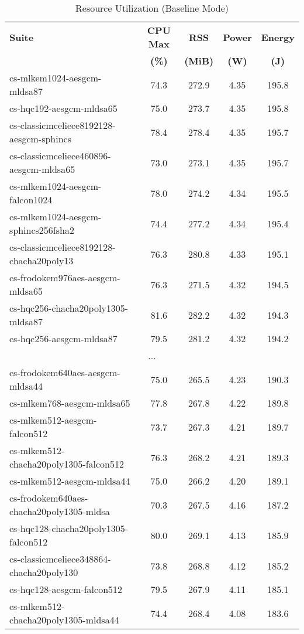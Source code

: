 \begin{table}[htbp]
\centering
\caption{Resource Utilization (Baseline Mode)}
\label{tab:resource_util}
\small
\begin{tabular}{@{}lcccc@{}}
\toprule
\textbf{Suite} & \textbf{CPU Max} & \textbf{RSS} & \textbf{Power} & \textbf{Energy} \\
 & \textbf{(\%)} & \textbf{(MiB)} & \textbf{(W)} & \textbf{(J)} \\
\midrule
cs-mlkem1024-aesgcm-mldsa87 & 74.3 & 272.9 & 4.35 & 195.8 \\
cs-hqc192-aesgcm-mldsa65 & 75.0 & 273.7 & 4.35 & 195.8 \\
cs-classicmceliece8192128-aesgcm-sphincs & 78.4 & 278.4 & 4.35 & 195.7 \\
cs-classicmceliece460896-aesgcm-mldsa65 & 73.0 & 273.1 & 4.35 & 195.7 \\
cs-mlkem1024-aesgcm-falcon1024 & 78.0 & 274.2 & 4.34 & 195.5 \\
cs-mlkem1024-aesgcm-sphincs256fsha2 & 74.4 & 277.2 & 4.34 & 195.4 \\
cs-classicmceliece8192128-chacha20poly13 & 76.3 & 280.8 & 4.33 & 195.1 \\
cs-frodokem976aes-aesgcm-mldsa65 & 76.3 & 271.5 & 4.32 & 194.5 \\
cs-hqc256-chacha20poly1305-mldsa87 & 81.6 & 282.2 & 4.32 & 194.3 \\
cs-hqc256-aesgcm-mldsa87 & 79.5 & 281.2 & 4.32 & 194.2 \\
\midrule
\multicolumn{5}{c}{...}\\
\midrule
cs-frodokem640aes-aesgcm-mldsa44 & 75.0 & 265.5 & 4.23 & 190.3 \\
cs-mlkem768-aesgcm-mldsa65 & 77.8 & 267.8 & 4.22 & 189.8 \\
cs-mlkem512-aesgcm-falcon512 & 73.7 & 267.3 & 4.21 & 189.7 \\
cs-mlkem512-chacha20poly1305-falcon512 & 76.3 & 268.2 & 4.21 & 189.3 \\
cs-mlkem512-aesgcm-mldsa44 & 75.0 & 266.2 & 4.20 & 189.1 \\
cs-frodokem640aes-chacha20poly1305-mldsa & 70.3 & 267.5 & 4.16 & 187.2 \\
cs-hqc128-chacha20poly1305-falcon512 & 80.0 & 269.1 & 4.13 & 185.9 \\
cs-classicmceliece348864-chacha20poly130 & 73.8 & 268.8 & 4.12 & 185.2 \\
cs-hqc128-aesgcm-falcon512 & 79.5 & 267.9 & 4.11 & 185.1 \\
cs-mlkem512-chacha20poly1305-mldsa44 & 74.4 & 268.4 & 4.08 & 183.6 \\
\bottomrule
\end{tabular}
\end{table}
